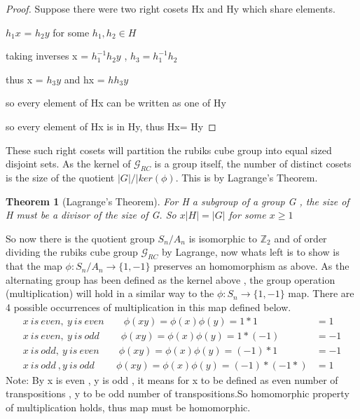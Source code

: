 \documentclass{article}
\newtheorem{theorem}{Theorem}[section]
\begin{document}
\begin{proof}
\item Suppose there were two right cosets Hx and Hy which share elements.
\item $h_{1}x$ = $h_{2}y$ for some $h_{1},h_{2} \in H$
\item taking inverses x = $h_{1}^{-1}h_{2}y$ , $h_{3} = h_{1}^{-1}h_{2}$
\item thus x = $h_{3}y$ and hx = $hh_{3}y$
\item so every element of Hx can be written as one of Hy
\item so every element of Hx is in Hy, thus Hx= Hy
\end{proof} These such right cosets will partition the rubiks cube group into equal sized disjoint sets. As the kernel of $\mathcal{G}_{RC}$ is a group itself, the number of distinct cosets is the size of the quotient $|G|/|ker(\phi)$. This is by Lagrange's Theorem.
\begin{theorem}[Lagrange's Theorem]
\label{Lagrange}
For H a subgroup of a group G , the size of H must be a divisor of the size of G.
So $x|H| = |G|$ for some $x\geq1$
\end{theorem}So now there is the quotient group $S_{n}/A_{n}$ is isomorphic to $\mathbb{Z}_{2}$ and of order dividing the rubiks cube group $\mathcal{G}_{RC}$ by Lagrange, now whats left is to show is that the map $\phi : S_{n}/A_{n} \rightarrow \{1,-1\}$ preserves an homomorphism as above. As the alternating group has been defined as the kernel above , the group operation (multiplication) will hold in a similar way to the $\phi : S_{n} \rightarrow \{1,-1\}$ map. There are 4 possible occurrences of multiplication in this map defined below.
\begin{align}
x\ is\ even,\ y\ is\ even\qquad	\phi(xy) = \phi(x)\phi(y) = 1*1 &= 1\\
x\ is\ even,\ y\ is\ odd\ \qquad	\phi(xy) = \phi(x)\phi(y) = 1*(-1) &= -1\\
x\ is\ odd,\ y\ is\ even\qquad	\phi(xy) = \phi(x)\phi(y) = (-1)*1 &= -1\\
x\ is\ odd\ ,y\ is\ odd \ \qquad	\phi(xy) = \phi(x)\phi(y) = (-1)*(-1*) &= 1
\end{align}
Note: By x is even , y is odd , it means for x to be defined as even number of transpositions , y to be odd number of transpositions.So homomorphic property of multiplication holds, thus map must be homomorphic.


\end{document}
